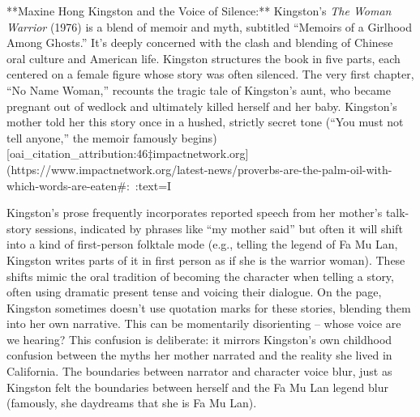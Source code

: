 \documentclass[12pt]{report}
\begin{document}
**Maxine Hong Kingston and the Voice of Silence:** Kingston’s \textit{The Woman Warrior} (1976) is a blend of memoir and myth, subtitled “Memoirs of a Girlhood Among Ghosts.” It’s deeply concerned with the clash and blending of Chinese oral culture and American life. Kingston structures the book in five parts, each centered on a female figure whose story was often silenced. The very first chapter, “No Name Woman,” recounts the tragic tale of Kingston’s aunt, who became pregnant out of wedlock and ultimately killed herself and her baby. Kingston’s mother told her this story once in a hushed, strictly secret tone (“You must not tell anyone,” the memoir famously begins) [oai_citation_attribution:46‡impactnetwork.org](https://www.impactnetwork.org/latest-news/proverbs-are-the-palm-oil-with-which-words-are-eaten#:~:text=I%

Kingston’s prose frequently incorporates reported speech from her mother’s talk-story sessions, indicated by phrases like “my mother said” but often it will shift into a kind of first-person folktale mode (e.g., telling the legend of Fa Mu Lan, Kingston writes parts of it in first person as if she is the warrior woman). These shifts mimic the oral tradition of becoming the character when telling a story, often using dramatic present tense and voicing their dialogue. On the page, Kingston sometimes doesn’t use quotation marks for these stories, blending them into her own narrative. This can be momentarily disorienting – whose voice are we hearing? This confusion is deliberate: it mirrors Kingston’s own childhood confusion between the myths her mother narrated and the reality she lived in California. The boundaries between narrator and character voice blur, just as Kingston felt the boundaries between herself and the Fa Mu Lan legend blur (famously, she daydreams that she is Fa Mu Lan). 
\end{document}
